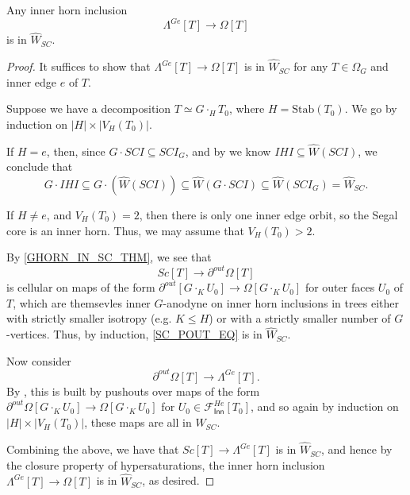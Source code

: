 \documentclass[a4paper,10pt,draft]{article}%
\begin{document}
\begin{lemma}
      \label{GHORN_IN_SC_THM}
      Any inner horn inclusion
      \begin{equation}
            \Lambda^{G e}[T] \to \Omega[T]
      \end{equation}
      is in $\hat{W}_{SC}.$
\end{lemma}
\begin{proof}
      It suffices to show that $\Lambda^{G e}[T] \to \Omega[T]$ is in $\hat{W}_{SC}$
      for any $T\in \Omega_G$ and inner edge $e$ of $T$.

      Suppose we have a decomposition $T \simeq G \cdot_H T_0$, where $H = \mathrm{Stab}(T_0)$.
      We go by induction on $|H| \times |V_H(T_0)|$.

      If $H = e$, then, since $G \cdot SCI \subseteq SCI_G$,
      and by \cite[2.5]{CM13a} we know $IHI \subseteq \hat{W}(SCI)$, we conclude that
      \begin{equation}
            G \cdot IHI \subseteq G \cdot (\hat{W}(SCI)) \subseteq \hat{W}(G \cdot SCI) \subseteq \hat{W}(SCI_G) = \hat{W}_{SC}.
      \end{equation}
      
      If $H \neq e$, and $V_H(T_0) = 2$, then there is only one inner edge orbit, so
      the Segal core is an inner horn.
      Thus, we may assume that $V_H(T_0) > 2$.

      By \cref{GHORN_IN_SC_THM}, we see that
      \begin{equation}
            \label{SC_POUT_EQ}
            Sc[T] \to \partial^{out}\Omega[T]
      \end{equation}
      is cellular on maps of the form
      $\partial^{out}[G \cdot_K U_0] \to \Omega[G \cdot_K U_0]$ for outer faces $U_0$ of $T$,
      which are themsevles inner $G$-anodyne on inner horn inclusions in trees either
      with strictly smaller isotropy (e.g. $K \leq H$) or
      with a strictly smaller number of $G$-vertices.
      Thus, by induction, \eqref{SC_POUT_EQ} is in $\hat{W}_{SC}$. 

      Now consider
      \begin{equation}
            \label{POUT_GHORN_EQ}
            \partial^{out}\Omega[T] \to \Lambda^{G e}[T].
      \end{equation}
      By \cite[Proposition 6.17]{Per17},
      this is built by pushouts over maps of the form
      $\partial^{out}\Omega[G \cdot_K U_0] \to \Omega[G \cdot_K U_0]$ for $U_0 \in \mathscr{F}_{\mathsf{Inn}}^{H e}[T_0]$,
      and so again by induction on $|H| \times |V_H(T_0)|$, these maps are all in $\hat{W}_{SC}$. 
      
      Combining the above, we have that $Sc[T] \to \Lambda^{G e}[T]$ is in $\hat{W}_{SC}$, and hence
      by the closure property of hypersaturations, the inner horn inclusion $\Lambda^{G e}[T] \to \Omega[T]$
      is in $\hat{W}_{SC}$, as desired.
\end{proof}
\end{document}
